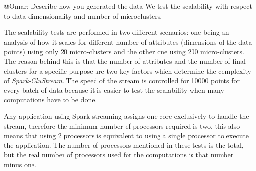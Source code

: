 \color{red}@Omar: Describe how you generated the data\color{black}
We test the scalability with respect to data dimensionality and number of microclusters.

The scalability tests are performed in two different scenarios: one being an analysis of how it scales for different number of attributes (dimensions of the data points) using only 20 micro-clusters and the other one using 200 micro-clusters. The reason behind this is that the number of attributes and the number of final clusters for a specific purpose are two key factors which determine the complexity of \textit{Spark-CluStream}. The speed of the stream is controlled for 10000 points for every batch of data because it is easier to test the scalability when many computations have to be done.

Any application using Spark streaming assigns one core exclusively to handle the stream, therefore the minimum number of processors required is two, this also means that using 2 processors is equivalent to using a single processor to execute the application. The number of processors mentioned in these tests is the total, but the real number of processors used for the computations is that number minus one.



